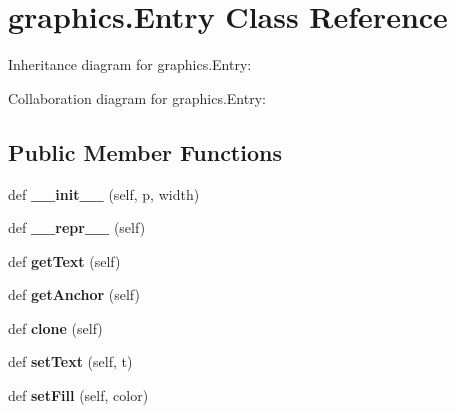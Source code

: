 \hypertarget{classgraphics_1_1Entry}{}\section{graphics.\+Entry Class Reference}
\label{classgraphics_1_1Entry}


Inheritance diagram for graphics.\+Entry\+:


Collaboration diagram for graphics.\+Entry\+:
\subsection*{Public Member Functions}
\begin{DoxyCompactItemize}
\item 
def {\bfseries \+\_\+\+\_\+init\+\_\+\+\_\+} (self, p, width)\hypertarget{classgraphics_1_1Entry_afb968169b4da90b66fd7cc34ffe8d93a}{}\label{classgraphics_1_1Entry_afb968169b4da90b66fd7cc34ffe8d93a}

\item 
def {\bfseries \+\_\+\+\_\+repr\+\_\+\+\_\+} (self)\hypertarget{classgraphics_1_1Entry_aea5b15bc4da7ede46e7cdd9991748c9e}{}\label{classgraphics_1_1Entry_aea5b15bc4da7ede46e7cdd9991748c9e}

\item 
def {\bfseries get\+Text} (self)\hypertarget{classgraphics_1_1Entry_a0a09f97f04f3d54bf8a5ca3edf99ef19}{}\label{classgraphics_1_1Entry_a0a09f97f04f3d54bf8a5ca3edf99ef19}

\item 
def {\bfseries get\+Anchor} (self)\hypertarget{classgraphics_1_1Entry_ab0a6e815195a49e1e682eb94d4735c9e}{}\label{classgraphics_1_1Entry_ab0a6e815195a49e1e682eb94d4735c9e}

\item 
def {\bfseries clone} (self)\hypertarget{classgraphics_1_1Entry_a15f95f96006286fead5e136792932434}{}\label{classgraphics_1_1Entry_a15f95f96006286fead5e136792932434}

\item 
def {\bfseries set\+Text} (self, t)\hypertarget{classgraphics_1_1Entry_a6a8f8c6cbc38f8efabe66785f09c735c}{}\label{classgraphics_1_1Entry_a6a8f8c6cbc38f8efabe66785f09c735c}

\item 
def {\bfseries set\+Fill} (self, color)\hypertarget{classgraphics_1_1Entry_ad1d04de2ffd36b0b6d6733fe992303ee}{}\label{classgraphics_1_1Entry_ad1d04de2ffd36b0b6d6733fe992303ee}


\end{DoxyCompactItemize}
